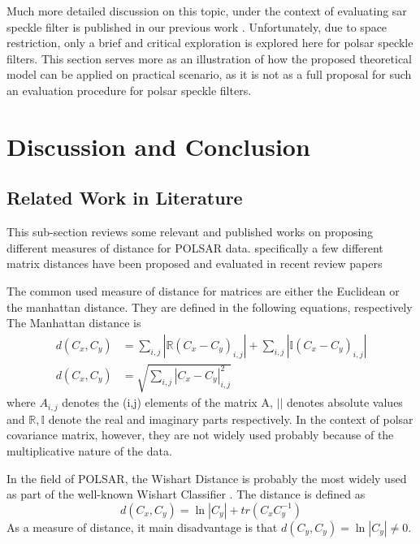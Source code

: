 \documentclass[journal]{IEEEtran}
\begin{document}
Much more detailed discussion on this topic, 
  under the context of evaluating sar speckle filter is published in our previous work \cite{Le_2013_TGRS_SAR_MSE}.
Unfortunately, due to space restriction, only a brief and critical exploration is explored here for polsar speckle filters.
This section serves more as an illustration of how the proposed theoretical model can be applied on practical scenario,
  as it is not as a full proposal for such an evaluation procedure for polsar speckle filters.

\section{Discussion and Conclusion}
\label{sec:discussion_conclusion}

\subsection{Related Work in Literature}
This sub-section reviews some relevant and published works on proposing different measures of distance for POLSAR data. 
specifically a few different matrix distances have been proposed and evaluated in recent review papers\cite{Dabboor_2013_IJRS_1492}\cite{Kersten_2005_TGRS_519}

The common used measure of distance for matrices are either the Euclidean or the manhattan distance.
They are defined in the following equations, respectively 
The Manhattan distance is
\begin{align}
  d(C_x,C_y) &= \sum_{i,j} |\mathbb{R} (C_x - C_y)_{i,j}| + \sum_{i,j} |\mathbb{I} (C_x - C_y)_{i,j}| \\
  d(C_x,C_y) &= \sqrt{\sum_{i,j} |C_x - C_y|_{i,j}^2 }
\end{align}
where $A_{i,j}$ denotes the (i,j) elements of the matrix A,
 $||$ denotes absolute values
and $\mathbb{R},\mathbb{I}$ denote the real and imaginary parts respectively.
In the context of polsar covariance matrix, however, they are not widely used 
  probably because of the multiplicative nature of the data.

In the field of POLSAR, the Wishart Distance is probably the most widely used as part of the well-known Wishart Classifier \cite{Lee_1999_TGRS}.
The distance is defined as \cite{Lee_1994_IJRS_2299}
\begin{equation}
  d(C_x,C_y) = \ln|C_y| + tr(C_xC_y^{-1})
\end{equation}
As a measure of distance, it main disadvantage is that $d(C_y,C_y) = \ln|C_y| \neq 0$.
\end{document}
